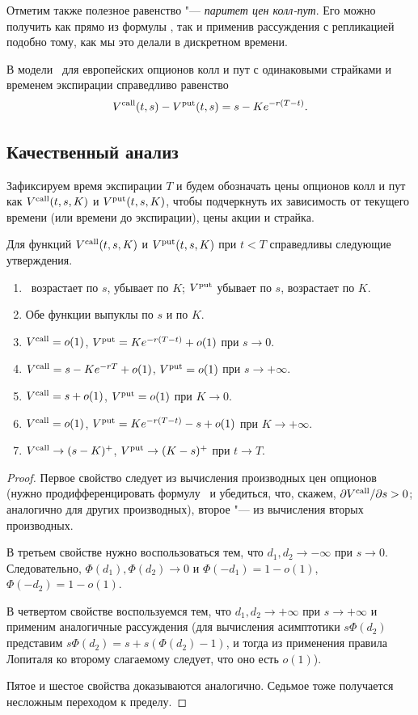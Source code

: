 Отметим также полезное равенство "--- \emph{паритет цен колл-пут}.
Его можно получить как прямо из формулы \bs, так и применив рассуждения с репликацией подобно тому, как мы это делали в дискретном времени.

\begin{corollary}
В модели \bs\ для европейских опционов колл и пут с одинаковыми страйками и временем экспирации справедливо равенство
\[
V^{\text{\normalfont call}}(t,s) - V^{\text{\normalfont put}}(t,s) = s - K e^{-r(T-t)}.
\]
\end{corollary}


\subsection{Качественный анализ}
Зафиксируем время экспирации $T$ и будем обозначать цены опционов колл и пут как $V^{\text{\normalfont call}}(t,s,K)$ и $V^{\text{\normalfont put}}(t,s,K)$, чтобы подчеркнуть их зависимость от текущего времени (или времени до экспирации), цены акции и страйка.
\begin{proposition}
Для функций $V^{\text{\normalfont call}}(t,s, K)$ и $V^{\text{\normalfont put}}(t,s, K)$ при $t<T$ справедливы следующие утверждения.
\begin{enumerate}
\item \VC\ возрастает по $s$, убывает по $K$; $V^{\text{\normalfont put}}$ убывает по $s$, возрастает по $K$.
\item Обе функции выпуклы по $s$ и по $K$.
\item $V^{\text{\normalfont call}} = o(1)$, $V^{\text{\normalfont put}}= Ke^{-r(T-t)} + o(1)$ при $s\to 0$.
\item $V^{\text{\normalfont call}} = s - Ke^{-rT} + o(1)$, $V^{\text{\normalfont put}} = o(1)$ при $s\to+\infty$.
\item $V^{\text{\normalfont call}} = s + o(1)$, $V^{\text{\normalfont put}} = o(1)$ при $K\to 0 $.
\item $V^{\text{\normalfont call}} = o(1)$, $V^{\text{\normalfont put}} = Ke^{-r(T-t)} - s + o(1)$ при $K\to+\infty$.
\item $V^{\text{\normalfont call}} \to (s-K)^+$, $V^{\text{\normalfont put}} \to (K-s)^+$ при $t\to T$.
\end{enumerate}
\end{proposition}

\begin{proof}
Первое свойство следует из вычисления производных цен опционов (нужно продифференцировать формулу \bs\ и убедиться, что, скажем, $\partial V^{\text{\normalfont call}}/\partial s>0$; аналогично для других производных), второе "--- из вычисления вторых производных.

В третьем свойстве нужно воспользоваться тем, что $d_1,d_2 \to -\infty$ при $s\to0$. 
Следовательно, $\Phi(d_1),\Phi(d_2) \to 0$ и $\Phi(-d_1) = 1 - o(1)$, $\Phi(-d_2) = 1 - o(1)$.

В четвертом свойстве воспользуемся тем, что $d_1,d_2 \to +\infty$ при $s\to+\infty$ и применим аналогичные рассуждения (для вычисления асимптотики $s\Phi(d_2)$ представим $s\Phi(d_2) = s + s(\Phi(d_2)-1)$, и тогда из применения правила Лопиталя ко второму слагаемому следует, что оно есть $o(1)$).

Пятое и шестое свойства доказываются аналогично. Седьмое тоже получается несложным переходом к пределу.
\end{proof}


